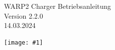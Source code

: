 \documentclass[a4paper,10pt]{article}
\title{}
\author{}
\newcommand{\gfx}[1]{\texttt{[image: \#1]}}
\begin{document}
\pagestyle{empty}
\begin{titlepage}
    \vspace*{-3.08cm}
    \colorbox{boxgray}{}
    \vfill
    \begin{center}
        \Huge
        WARP2 Charger Betriebsanleitung\\\vspace{1cm}
        \large
        Version 2.2.0\\\vspace{0.25cm}
        14.03.2024
    \end{center}
    \vfill \gfx{./img_warp2/resized/warp_perspective_blue_ready}
\end{titlepage}
\newpage
\null
\newpage
\pagestyle{fancy}
\end{document}
